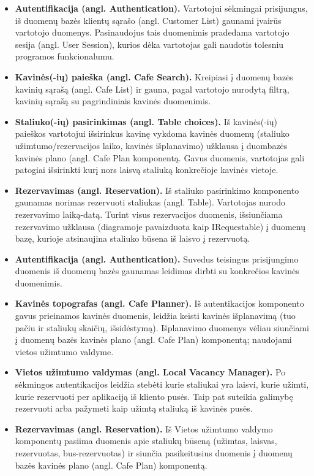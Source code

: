 \documentclass{VUMIFPSkursinis}
\begin{document}
\begin{itemize}
  \item \textbf{Autentifikacija (angl. Authentication).} Vartotojui sėkmingai prisijungus, iš duomenų bazės klientų sąrašo (angl. Customer List) gaunami įvairūs vartotojo duomenys. Pasinaudojus tais duomenimis pradedama vartotojo sesija (angl. User Session), kurios dėka vartotojas gali naudotis tolesniu programos funkcionalumu.
  \item \textbf{Kavinės(-ių) paieška (angl. Cafe Search).} Kreipiasi į duomenų bazės kavinių sąrašą (angl. Cafe List) ir gauna, pagal vartotojo nurodytą filtrą, kavinių sąrašą su pagrindiniais kavinės duomenimis.
  \item \textbf{Staliuko(-ių) pasirinkimas (angl. Table choices).}  Iš kavinės(-ių) paieškos vartotojui išsirinkus kavinę vykdoma kavinės duomenų (staliuko užimtumo/rezervacijos laiko, kavinės išplanavimo) užklausa į duombazės kavinės plano (angl. Cafe Plan komponentą. Gavus duomenis, vartotojas gali patogiai išsirinkti kurį nors laisvą staliuką konkrečioje kavinės vietoje.
  \item \textbf{Rezervavimas (angl. Reservation).} Iš staliuko pasirinkimo komponento gaunamas norimas rezervuoti staliukas (angl. Table). Vartotojas nurodo rezervavimo laiką-datą. Turint visus rezervacijos duomenis, išsiunčiama rezervavimo užklausa (diagramoje pavaizduota kaip IRequestable) į duomenų bazę, kurioje atsinaujina staliuko būsena iš laisvo į rezervuotą.
\end{itemize}

\begin{itemize}
  \item \textbf{Autentifikacija (angl. Authentication).} Suvedus teisingus prisijungimo duomenis iš duomenų bazės gaunamas leidimas dirbti su konkrečios kavinės duomenimis.
  \item \textbf{Kavinės topografas (angl. Cafe Planner).} Iš autentikacijos komponento gavus prieinamos kavinės duomenis, leidžia keisti kavinės išplanavimą (tuo pačiu ir staliukų skaičių, išsidėstymą). Išplanavimo duomenys vėliau siunčiami į duomenų bazės kavinės plano (angl. Cafe Plan) komponentą; naudojami vietos užimtumo valdyme.
  \item \textbf{Vietos užimtumo valdymas (angl. Local Vacancy Manager).} Po sėkmingos autentikacijos leidžia stebėti kurie staliukai yra laisvi, kurie užimti, kurie rezervuoti per aplikaciją iš kliento pusės. Taip pat suteikia galimybę rezervuoti arba pažymeti kaip užimtą staliuką iš kavinės pusės.
  \item \textbf{Rezervavimas (angl. Reservation).} Iš Vietos užimtumo valdymo komponentų pasiima duomenis apie staliukų būseną (užimtas, laisvas, rezervuotas, bus-rezervuotas) ir siunčia pasikeitusius duomenis į duomenų bazės kavinės plano (angl. Cafe Plan) komponentą.
\end{itemize}
\end{document}
